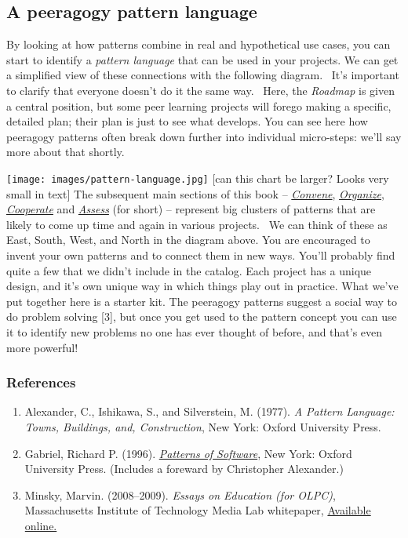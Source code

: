 \hypertarget{a-peeragogy-pattern-language}{%
\subsection{A peeragogy pattern
language}\label{a-peeragogy-pattern-language}}

By looking at how patterns combine in real and hypothetical use cases,
you can start to identify a \emph{pattern language} that can be used in
your projects. We can get a simplified view of these connections with
the following diagram.~ It's important to clarify that everyone doesn't
do it the same way.~ Here, the \emph{Roadmap} is given a central
position, but some peer learning projects will forego making a specific,
detailed plan; their plan is just to see what develops. You can see here
how peeragogy patterns often break down further into individual
micro-steps: we'll say more about that shortly.

\texttt{[image: images/pattern-language.jpg]} {[}can this chart be
larger? Looks very small in text{]} The subsequent main sections of this
book -- \href{http://peeragogy.org/convene/}{\emph{Convene}},
\href{http://peeragogy.org/organize/}{\emph{Organize}},
\href{http://peeragogy.org/facilitate/}{\emph{Cooperate}} and
\href{http://peeragogy.org/assessment/}{\emph{Assess}} (for short) --
represent big clusters of patterns that are likely to come up time and
again in various projects.~ We can think of these as East, South, West,
and North in the diagram above. You are encouraged to invent your own
patterns and to connect them in new ways. You'll probably find quite a
few that we didn't include in the catalog. Each project has a unique
design, and it's own unique way in which things play out in practice.
What we've put together here is a starter kit. The peeragogy patterns
suggest a social way to do problem solving {[}3{]}, but once you get
used to the pattern concept you can use it to identify new problems no
one has ever thought of before, and that's even more powerful!

\hypertarget{references}{%
\subsubsection{References}\label{references}}

\begin{enumerate}
\def\labelenumi{\arabic{enumi}.}
\item
  Alexander, C., Ishikawa, S., and Silverstein, M. (1977). \emph{A
  Pattern Language: Towns, Buildings, and, Construction}, New York:
  Oxford University Press.
\item
  Gabriel, Richard P. (1996).
  \emph{\href{http://dreamsongs.net/Files/PatternsOfSoftware.pdf}{Patterns
  of Software}}, New York: Oxford University Press. (Includes a foreward
  by Christopher Alexander.)
\item
  Minsky, Marvin. (2008--2009). \emph{Essays on Education (for
  {O}{L}{P}{C})}, Massachusetts Institute of Technology Media Lab
  whitepaper,
  \href{http://web.media.mit.edu/~minsky/OLPC-1.html}{Available online.}
\end{enumerate}
